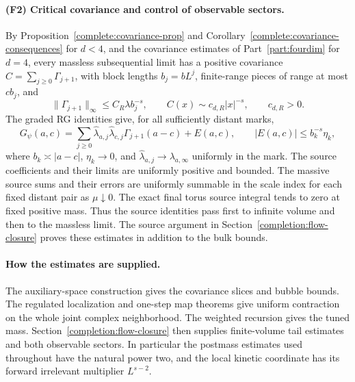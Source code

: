 \documentclass[11pt]{article}
\begin{document}
\paragraph{(F2) Critical covariance and control of observable sectors.}
By Proposition~\ref{complete:covariance-prop} and
Corollary~\ref{complete:covariance-consequences} for \(d<4\), and the covariance estimates of Part~\ref{part:fourdim} for \(d=4\), every massless
subsequential limit has a positive covariance
\(C=\sum_{j\ge0}\Gamma_{j+1}\), with block lengths \(b_j=bL^j\),
finite-range pieces of range at most \(cb_j\), and
\[
 \|\Gamma_{j+1}\|_\infty\le C_R\lambda b_j^{-s},
 \qquad C(x)\sim c_{d,R}|x|^{-s},\qquad c_{d,R}>0.
\]
The graded RG identities give, for all sufficiently distant marks,
\begin{equation}\label{frac:source-input}
 G_\psi(a,c)=\sum_{j\ge0}\widehat\lambda_{a,j}
                 \widehat\lambda_{c,j}\Gamma_{j+1}(a-c)+E(a,c),
 \qquad |E(a,c)|\le b_k^{-s}\eta_k,
\end{equation}
where \(b_k\asymp|a-c|\), \(\eta_k\to0\), and
\(\widehat\lambda_{a,j}\to\lambda_{a,\infty}\) uniformly in the mark.
The source coefficients and their limits are uniformly positive and bounded. The massive
source sums and their errors are uniformly summable in the scale
index for each fixed distant pair as \(\mu\downarrow0\).
The exact final torus source integral tends to zero at fixed positive
mass. Thus the source identities pass first to infinite volume and
then to the massless limit. The source argument in Section~\ref{completion:flow-closure} proves these estimates in addition to the bulk bounds.

\paragraph{How the estimates are supplied.}
The auxiliary-space construction gives the covariance slices and bubble
bounds. The regulated localization and one-step map theorems give
uniform contraction on the whole joint complex neighborhood. The
weighted recursion gives the tuned mass. Section~\ref{completion:flow-closure}
then supplies finite-volume tail estimates and both observable sectors.
In particular the postmass estimates used throughout have the natural
power two, and the local kinetic coordinate has its forward irrelevant
multiplier \(L^{s-2}\).
\end{document}
